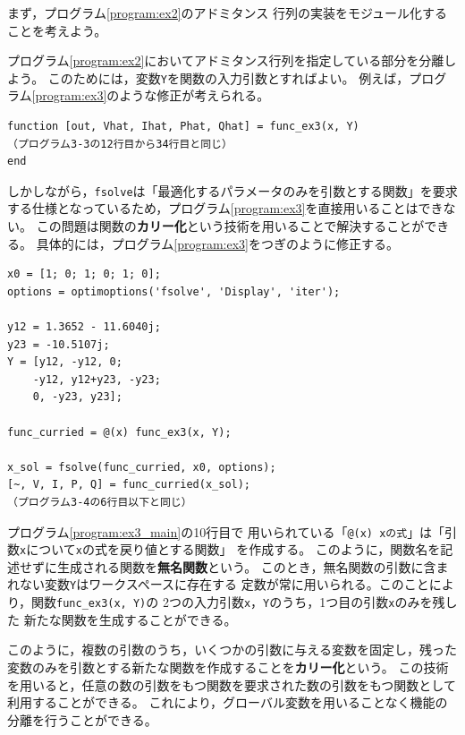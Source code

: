 \documentclass[tombow,dvipdfmx]{corona-a5-1.1}
\begin{document}
まず，プログラム\nobreak\ref{program:ex2}のアドミタンス
行列の実装をモジュール化することを考えよう。

\begin{例}[アドミタンス行列の実装の分離]

プログラム\nobreak\ref{program:ex2}においてアドミタンス行列を指定している部分を分離しよう。
このためには，変数\verb|Y|を関数の入力引数とすればよい。
例えば，プログラム\nobreak\ref{program:ex3}のような修正が考えられる。

\smallskip
\begin{PROGRAMA}[count, title={func\_ex3.m}]\label{program:ex3}
\begin{verbatim}
function [out, Vhat, Ihat, Phat, Qhat] = func_ex3(x, Y)
（プログラム3-3の12行目から34行目と同じ）
end
\end{verbatim}
\end{PROGRAMA}

しかしながら，\verb|fsolve|は「最適化するパラメータのみを引数とする関数」を要求する仕様となっているため，プログラム\ref{program:ex3}を直接用いることはできない。
この問題は関数の\textbf{カリー化}という技術を用いることで解決することができる。
具体的には，プログラム\ref{program:ex3}をつぎのように修正する。


\smallskip
\begin{PROGRAMA}[count,title={main\_ex3.m}]\label{program:ex3_main}
\begin{verbatim}
x0 = [1; 0; 1; 0; 1; 0];
options = optimoptions('fsolve', 'Display', 'iter');

y12 = 1.3652 - 11.6040j;
y23 = -10.5107j;
Y = [y12, -y12, 0;
    -y12, y12+y23, -y23;
    0, -y23, y23];

func_curried = @(x) func_ex3(x, Y);

x_sol = fsolve(func_curried, x0, options);
[~, V, I, P, Q] = func_curried(x_sol);
（プログラム3-4の6行目以下と同じ）
\end{verbatim}
\end{PROGRAMA}

プログラム\nobreak\ref{program:ex3_main}の10行目で
用いられている「\verb|@(x) xの式|」は「引数\verb|x|について\verb|x|の式を戻り値とする関数」
を作成する。
このように，関数名を記述せずに生成される関数を\textbf{無名関数}という。
このとき，無名関数の引数に含まれない変数\verb|Y|はワークスペースに存在する
定数が常に用いられる。このことにより，関数\verb|func_ex3(x, Y)|の
2つの入力引数\verb|x|，\verb|Y|のうち，1つ目の引数\verb|x|のみを残した
新たな関数を生成することができる。

このように，複数の引数のうち，いくつかの引数に与える変数を固定し，残った変数のみを引数とする新たな関数を作成することを\textbf{カリー化}という。
この技術を用いると，任意の数の引数をもつ関数を要求された数の引数をもつ関数として利用することができる。
これにより，グローバル変数を用いることなく機能の分離を行うことができる。

\end{例}
\end{document}

